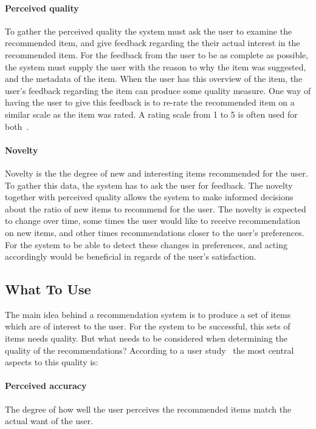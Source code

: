 \paragraph{Perceived quality}
To gather the perceived quality the system must ask the user to examine the recommended item, and give feedback regarding the their actual interest in the recommended item.
For the feedback from the user to be as complete as possible, the system must supply the user with the reason to why the item was suggested, and the metadata of the item.
When the user has this overview of the item, the user's feedback regarding the item can produce some quality measure.
One  way of having the user to give this feedback is to re-rate the recommended item on a similar scale as the item was rated.
A rating scale from 1 to 5 is often used for both~\cite{Schafer:1999:RSE:336992.337035}.

\paragraph{Novelty}
Novelty is the the degree of new and interesting items recommended for the user.
To gather this data, the system has to ask the user for feedback.
The novelty together with perceived quality allows the system to make informed decisions about the ratio of new items to recommend for the user.
The novelty is expected to change over time, some times the user would like to receive recommendation on new items, and other times recommendations closer to the user's preferences.
For the system to be able to detect these changes in preferences, and acting accordingly would be beneficial in regards of the user's satisfaction.


\subsection{What To Use}
The main idea behind a recommendation system is to produce a set of items which are of interest to the user.
For the system to be successful, this sets of items needs quality.
But what needs to be considered when determining the quality of the recommendations?
According to a user study~\cite{Pu:2011:UEF:2043932.2043962} the most central aspects to this quality is:


\paragraph{Perceived accuracy}
The degree of how well the user perceives the recommended items match the actual want of the user.

